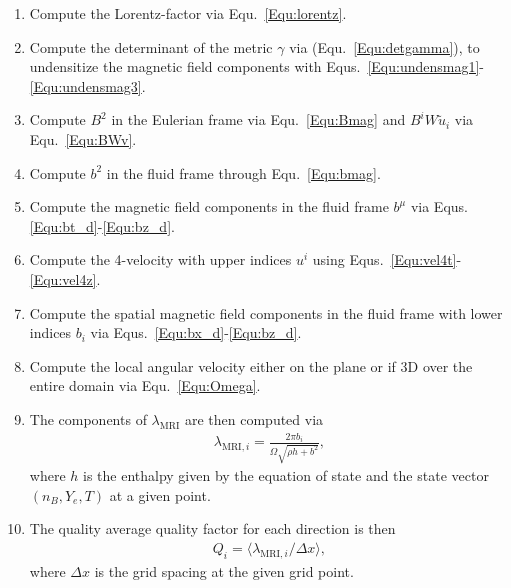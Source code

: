 \documentclass{article}
\begin{document}
\begin{enumerate}
  \item Compute the Lorentz-factor via Equ.~\eqref{Equ:lorentz}.
  \item Compute the determinant of the metric $\gamma$ via (Equ.~\eqref{Equ:detgamma}), to undensitize
  the magnetic field components with Equs.~\eqref{Equ:undensmag1}-\eqref{Equ:undensmag3}.
  \item Compute $B^2$ in the Eulerian frame via Equ.~\eqref{Equ:Bmag} and $B^iW\tilde{u}_i$ via Equ.~\eqref{Equ:BWv}.
  \item Compute $b^2$ in the fluid frame through Equ.~\eqref{Equ:bmag}.
  \item Compute the magnetic field components in the fluid frame $b^{\mu}$ via Equs.\eqref{Equ:bt_d}-\eqref{Equ:bz_d}.
  \item Compute the 4-velocity with upper indices $u^i$ using Equs.~\eqref{Equ:vel4t}-\eqref{Equ:vel4z}.
  \item Compute the spatial magnetic field components in the fluid frame with lower indices $b_i$ via
  Equs.~\eqref{Equ:bx_d}-\eqref{Equ:bz_d}.
  \item Compute the local angular velocity either on the plane or if 3D over the entire domain via Equ.~\eqref{Equ:Omega}.
  \item The components of $\lambda_{\mathrm{MRI}}$ are then computed via
  \begin{align}
    \lambda_{\mathrm{MRI},i}=\frac{2\pi b_i}{\Omega\sqrt{\rho h+b^2}},\nonumber
  \end{align}
  where $h$ is the enthalpy given by the equation of state and the state vector $(n_B,Y_e,T)$ at a given point.
  \item The quality average quality factor for each direction is then
  \begin{align}
    Q_i = \langle\lambda_{\mathrm{MRI},i}/\Delta x\rangle,\nonumber
  \end{align}
  where $\Delta x$ is the grid spacing at the given grid point.
\end{enumerate}
\end{document}
